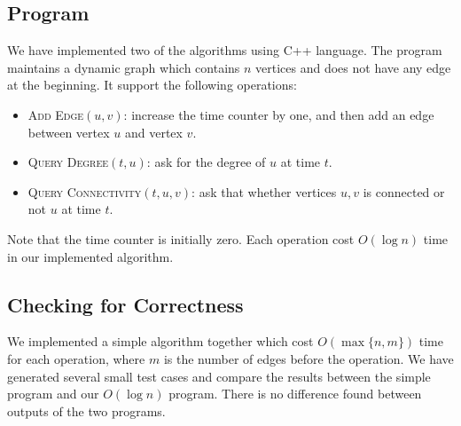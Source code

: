 \documentclass[12pt,abstract=true]{scrartcl}
\numberwithin{equation}{section}
\theoremstyle{definition}   \newtheorem{definition}{Definition}[section]
\theoremstyle{plain}        \newtheorem{theorem}{Theorem}[section]
\theoremstyle{plain}        \newtheorem{observation}{Observation}[section]
\theoremstyle{plain}        \newtheorem{fact}{Fact}[section]
\theoremstyle{plain}        \newtheorem{claim}{Claim}[section]
\theoremstyle{plain}        \newtheorem{lemma}[theorem]{Lemma}
\theoremstyle{plain}        \newtheorem{corollary}[theorem]{Corollary}
\theoremstyle{remark}       \newtheorem{example}{Example}[section]
\theoremstyle{remark}       \newtheorem{remark}{Remark}[section]
\begin{document}
\subsection{Program}
We have implemented two of the algorithms using C++ language.
The program maintains a dynamic graph which contains $n$ vertices and does not have
any edge at the beginning.
It support the following operations:
\begin{itemize}
	\item \textsc{Add Edge$(u,v)$:} increase the time counter by one, and then add an edge
		between vertex $u$ and vertex $v$.
	\item \textsc{Query Degree$(t,u)$:} ask for the degree of $u$ at time $t$.
	\item \textsc{Query Connectivity$(t,u,v)$:} ask that whether vertices $u,v$ is connected or not
		$u$ at time $t$.
\end{itemize}
Note that the time counter is initially zero.
Each operation cost $O(\log n)$ time in our implemented algorithm.

\subsection{Checking for Correctness}
We implemented a simple algorithm together which cost $O(\max\{n,m\})$ time for each operation,
	where $m$ is the number of edges before the operation.
We have generated several small test cases and compare the results between the simple program
	and our $O(\log n)$ program.
There is no difference found between outputs of the two programs.
\end{document}
